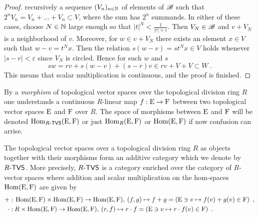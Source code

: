 \begin{proof}
  recursively a sequence $(V_n)_{n\in \mathbb{N} }$ of elements of $\mathscr{B}$ such that
  $2^nV_n = V_n + \ldots + V_n \subset V$, where the sum has $2^n$ summands. In either of these cases, choose 
  $N\in \mathbb{N}$ large enough so that $|t|^N < \frac{1}{|r| + \varepsilon}$. Then $V_N \in \mathscr{B}$
  and $v + V_N$ is a neighborhood of $v$. Moreover, for $w \in v + V_N$ there exists an element
  $x\in V$ such that $w-v = t^N x$. Then the relation
  $s (w-v) = s t^N x \in V $ holds whenever $|s-r| < \varepsilon$ since $V_N$ is circled. Hence for such $w$ and $s$
  \[
     sw = rv + s (w-v) + (s-r)v \in  rv + V + V \subset W \ . 
  \]
  This means that scalar multiplication is continuous, and the proof is finished. 
\end{proof}

\begin{definition}
  By a \emph{morphism} of topological vector spaces over the topological division
  ring $R$  one understands  a continuous $R$-linear map $f:\mathrm{E} \to\mathrm{F}$
  between two topological vector spaces $\mathrm{E}$ and $\mathrm{F}$
  over $R$. The space of morphisms between $\mathrm{E}$ and $\mathrm{F}$ will be denoted
  $\operatorname{Hom}\nolimits_{R\text{-}\mathsf{TVS}} (\mathrm{E},\mathrm{F})$ or just
  $\operatorname{Hom}\nolimits_R (\mathrm{E},\mathrm{F})$ or $\operatorname{Hom}\nolimits (\mathrm{E},\mathrm{F})$
  if now confusion can arrise. 
\end{definition}

\begin{theorem}
  The topological vector spaces over a topological division ring $R$ as objects together 
  with their morphisms form an additive category which we denote by  $R\text{-}\mathsf{TVS}$.
  More precisely, $R\text{-}\mathsf{TVS}$ is a category enriched over the category of
  $R$-vector spaces where addition and scalar multiplication on the hom-spaces
  $\operatorname{Hom}\nolimits (\mathrm{E},\mathrm{F})$  are given by
  \begin{align}
  \nonumber  
    +:&\:\operatorname{Hom}\nolimits (\mathrm{E},\mathrm{F}) \times \operatorname{Hom}\nolimits (\mathrm{E},\mathrm{F}) \to \operatorname{Hom}\nolimits (\mathrm{E},\mathrm{F}),\:
        (f,g) \mapsto f+g = \left(\mathrm{E} \ni v \mapsto f(v)+g(v)\in \mathrm{F}\right)\ , \\ \nonumber
    \cdot:&\:R  \times \operatorname{Hom}\nolimits (\mathrm{E},\mathrm{F}) \to \operatorname{Hom}\nolimits (\mathrm{E},\mathrm{F}),\:
        (r,f) \mapsto r \cdot f = \left(\mathrm{E} \ni v \mapsto r \cdot f(v) \in \mathrm{F}\right) \ .
  \end{align}
\end{theorem}

